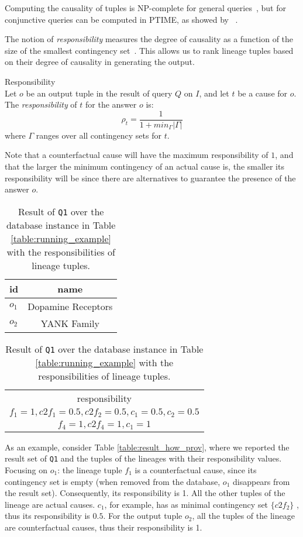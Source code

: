 Computing the causality of tuples is NP-complete for general queries~\cite{EiterL02}, but for conjunctive queries can be computed in PTIME, as showed by ~\citet{MeliouGMS11}. 


The notion of \emph{responsibility}  measures the degree of causality as a function of the size of the smallest contingency set~\cite{ChocklerH04}. This  allows us to rank lineage tuples based on their degree of causality in generating the output. 

\begin{definition}{Responsibility \cite{MeliouGMS11}}\\
\label{def:responsibility}
	Let $o$ be an output tuple in the result of query $Q$ on $I$, and let $t$ be a cause for $o$. The \emph{responsibility} of $t$ for the answer $o$ is:
	\[
		\rho_t = \frac{1}{1 + min_\Gamma|\Gamma|}
	\]
	where $\Gamma$ ranges over all contingency sets for $t$.
\end{definition}

Note that a counterfactual cause will have the maximum responsibility of $1$, and that the larger the minimum contingency of an actual cause is, the smaller its responsibility will be since there are alternatives to  guarantee the presence of the answer $o$.


\begin{table}[]
\footnotesize
\centering
  \begin{tabular}{|l|c|}
  \hline
    id & name\\
    \hline
    $o_1$ &  Dopamine Receptors\\
    $o_2$ & YANK Family\\
    \hline
  \end{tabular}
  \begin{tabular}{c}
  	responsibility   \\
  	$f_1=1, c2f_1=0.5, c2f_2=0.5, c_1=0.5, c_2=0.5$ \\
  	$f_4=1, c2f_4=1, c_1=1$ \\
  \end{tabular}
    \caption{Result of \texttt{Q1} over the database instance in Table \ref{table:running_example} with the responsibilities of lineage tuples.}
  \label{table:result_responsibility}
\end{table} 

As an example, consider Table \ref{table:result_how_prov}, where we reported the result set of \texttt{Q1} and the tuples of the lineages with their responsibility values. 
Focusing on $o_1$: the lineage tuple $f_1$ is a counterfactual cause, since its contingency set is empty (when removed from the database, $o_1$ disappears from the result set). Consequently, its responsibility is 1. All the other tuples of the lineage are actual causes. $c_1$, for example, has as minimal contingency set $\{c2f_2\}$ , thus its responsibility is $0.5$. 
For the output tuple $o_2$, all the tuples of the lineage are counterfactual causes, thus their responsibility is 1.

